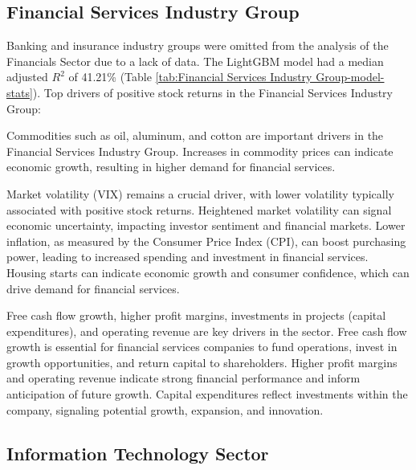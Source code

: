 \documentclass[12pt,a4paper,english]{article}
\begin{document}
\subsection{Financial Services Industry Group}
\label{sec:fin-serv}

Banking and insurance industry groups were omitted from the analysis of the Financials Sector due to a lack of data. The LightGBM model had a median adjusted $R^2$ of 41.21\% (Table \ref{tab:Financial Services Industry Group-model-stats}). Top drivers of positive stock returns in the Financial Services Industry Group:


Commodities such as oil, aluminum, and cotton are important drivers in the Financial Services Industry Group. Increases in commodity prices can indicate economic growth, resulting in higher demand for financial services.

Market volatility (VIX) remains a crucial driver, with lower volatility typically associated with positive stock returns. Heightened market volatility can signal economic uncertainty, impacting investor sentiment and financial markets. Lower inflation, as measured by the Consumer Price Index (CPI), can boost purchasing power, leading to increased spending and investment in financial services. Housing starts can indicate economic growth and consumer confidence, which can drive demand for financial services.

Free cash flow growth, higher profit margins, investments in projects (capital expenditures), and operating revenue are key drivers in the sector. Free cash flow growth is essential for financial services companies to fund operations, invest in growth opportunities, and return capital to shareholders. Higher profit margins and operating revenue indicate strong financial performance and inform anticipation of future growth. Capital expenditures reflect investments within the company, signaling potential growth, expansion, and innovation.

\subsection{Information Technology Sector}
\label{sec:info-tech}
\end{document}
